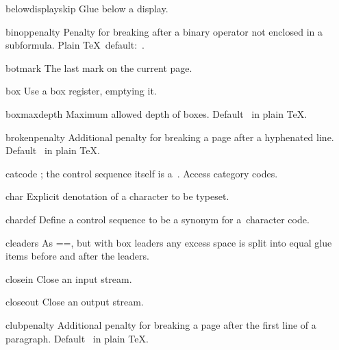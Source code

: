 \item belowdisplayskip
      Glue below a display.

\item binoppenalty
      Penalty for breaking after a binary operator not enclosed in
      a subformula.
      Plain \TeX\ default:~.

\item botmark
      The last mark on the current page.

\item box
      Use a box register, emptying it. 

\item boxmaxdepth
      Maximum allowed depth of boxes.
      Default~ in plain \TeX.

\item brokenpenalty
      Additional penalty for breaking a page after a hyphenated line. 
      Default~ in plain \TeX.

\item catcode
      ; the control sequence itself
      is a~.
      Access category codes.

\item char
      Explicit denotation of a character to be typeset. 

\item chardef
      Define a control sequence to be a synonym for
      a~character code.

\item cleaders
      As \ver=\leaders=, but with box leaders 
      any excess space is split into equal glue items
 \alt
      before and after the leaders.

\item closein
      Close an input stream.

\item closeout
      Close an output stream.

\item clubpenalty
      Additional penalty for breaking a page after the first line of a paragraph. 
      Default~ in plain \TeX.

